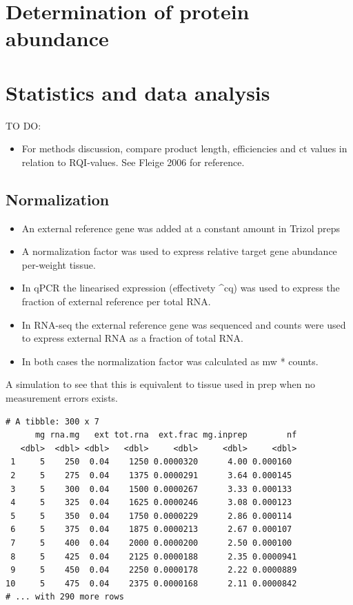 \documentclass[twoside,10pt]{gihclass} %
\providecommand{\tightlist}{%
  \setlength{\itemsep}{0pt}\setlength{\parskip}{0pt}}
\begin{document}
\hypertarget{determination-of-protein-abundance}{%
\section{Determination of protein abundance}\label{determination-of-protein-abundance}}

\hypertarget{statistics-and-data-analysis}{%
\section{Statistics and data analysis}\label{statistics-and-data-analysis}}

TO DO:
\begin{itemize}
\tightlist
\item
  For methods discussion, compare product length, efficiencies and ct
  values in relation to RQI-values. See Fleige 2006 for reference.
\end{itemize}
\hypertarget{normalization}{%
\subsection{Normalization}\label{normalization}}
\begin{itemize}
\tightlist
\item
  An external reference gene was added at a constant amount in Trizol
  preps
\item
  A normalization factor was used to express relative target gene
  abundance per-weight tissue.
\item
  In qPCR the linearised expression (effectivety \^{}cq) was used to
  express the fraction of external reference per total RNA.
\item
  In RNA-seq the external reference gene was sequenced and counts were
  used to express external RNA as a fraction of total RNA.
\item
  In both cases the normalization factor was calculated as mw *
  counts.
\end{itemize}
A simulation to see that this is equivalent to tissue used in prep when
no measurement errors exists.
\begin{verbatim}
# A tibble: 300 x 7
      mg rna.mg   ext tot.rna  ext.frac mg.inprep        nf
   <dbl>  <dbl> <dbl>   <dbl>     <dbl>     <dbl>     <dbl>
 1     5    250  0.04    1250 0.0000320      4.00 0.000160 
 2     5    275  0.04    1375 0.0000291      3.64 0.000145 
 3     5    300  0.04    1500 0.0000267      3.33 0.000133 
 4     5    325  0.04    1625 0.0000246      3.08 0.000123 
 5     5    350  0.04    1750 0.0000229      2.86 0.000114 
 6     5    375  0.04    1875 0.0000213      2.67 0.000107 
 7     5    400  0.04    2000 0.0000200      2.50 0.000100 
 8     5    425  0.04    2125 0.0000188      2.35 0.0000941
 9     5    450  0.04    2250 0.0000178      2.22 0.0000889
10     5    475  0.04    2375 0.0000168      2.11 0.0000842
# ... with 290 more rows
\end{verbatim}
\end{document}
